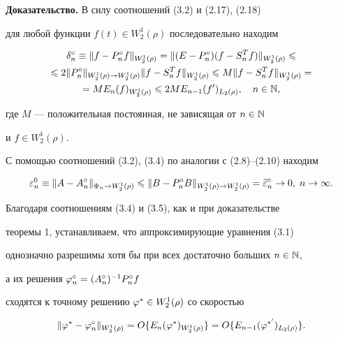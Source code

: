{\bf Доказательство.} В силу соотношений (3.2) и (2.17), (2.18) 


для  любой функции $f(t)\in W_2^1(\rho)$ последовательно находим 


\begin{multline}


\delta_n^\circ \equiv \|f-P_n^\circ f\|_{W_2^1(\rho)} =


\|(E-P_n^\circ)(f - S_n^Tf)\|_{W_2^1(\rho)}\lea \\


%


\lea 2\|P_n^\circ\|_{W_2^1(\rho)\to W_2^1(\rho)}


\|f - S_n^T f\|_{W_2^1(\rho)}\lea M \|f - S_n^T f\|_{W_2^1(\rho)} = \\


%


=ME_n(f)_{W_2^1(\rho)}\lea 2ME_{n-1}(f')_{L_2(\rho)},\quad n\in\N,


\end{multline}


где $M$ --- положительная постоянная, не зависящая от $n\in \Bbb N$


и $f\in W_2^1(\rho)$.





С помощью соотношений (3.2), (3.4) по аналогии с (2.8)--(2.10) находим 


\begin{equation}


\ve_n^0\equiv \|A-A_n^\circ\|_{\Phi_n\to W_2^1(\rho)} \lea


\|B-P_n^\circ B\|_{W_2^1(\rho)\to W_2^1(\rho)} =


\widetilde{\ve}{}_n^\circ\to 0,\; n\to \infty.


\end{equation}





Благодаря соотношениям (3.4) и (3.5), как и при доказательстве 


теоремы 1, устанавливаем, что аппроксимирующие уравнения (3.1) 


однозначно разрешимы хотя бы при всех достаточно больших $n\in \Bbb N$, 


а их решения $\varphi_n^\circ=(A_n^\circ)^{-1}P_n^\circ f$ 


сходятся к точному решению $\varphi^*\in W_2^1(\rho)$ со скоростью


\begin{equation}


\|\vp^*-\vp_n^\circ\|_{W_2^1(\rho)} = O\{E_n(\vp^*)_{W_2^1(\rho)}\}


= O\{E_{n-1}(\vp^{*'})_{L_2(\rho)}\}.


\end{equation}


